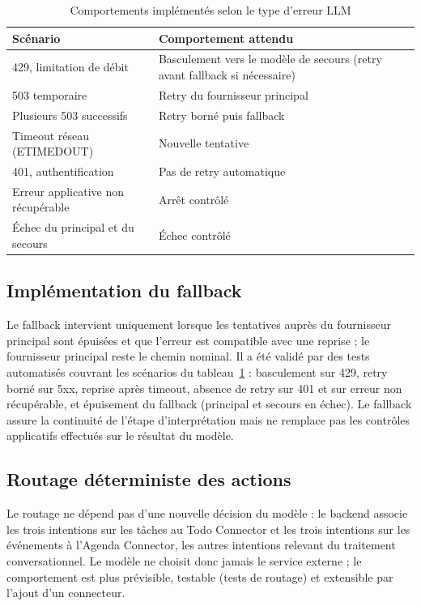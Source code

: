 \documentclass[11pt,a4paper,openany,oneside]{report}
\begin{document}
\begin{table}[htbp]
\centering\small
\caption{Comportements implémentés selon le type d'erreur LLM}\label{tab:erreurs-llm}
\begin{tabularx}{\textwidth}{@{}p{5.6cm}X@{}}
\toprule
\textbf{Scénario} & \textbf{Comportement attendu} \\
\midrule
429, limitation de débit & Basculement vers le modèle de secours (retry avant fallback si nécessaire) \\
503 temporaire & Retry du fournisseur principal \\
Plusieurs 503 successifs & Retry borné puis fallback \\
Timeout réseau (ETIMEDOUT) & Nouvelle tentative \\
401, authentification & Pas de retry automatique \\
Erreur applicative non récupérable & Arrêt contrôlé \\
Échec du principal et du secours & Échec contrôlé \\
\bottomrule
\end{tabularx}
\end{table}

\subsection{Implémentation du fallback}
Le fallback intervient uniquement lorsque les tentatives auprès du fournisseur principal sont épuisées et que l'erreur est compatible avec une reprise ; le fournisseur principal reste le chemin nominal. Il a été validé par des tests automatisés couvrant les scénarios du tableau~\ref{tab:erreurs-llm} : basculement sur 429, retry borné sur 5xx, reprise après timeout, absence de retry sur 401 et sur erreur non récupérable, et épuisement du fallback (principal et secours en échec). Le fallback assure la continuité de l'étape d'interprétation mais ne remplace pas les contrôles applicatifs effectués sur le résultat du modèle.

\subsection{Routage déterministe des actions}\label{sec:routage}
Le routage ne dépend pas d'une nouvelle décision du modèle : le backend associe les trois intentions sur les tâches au Todo Connector et les trois intentions sur les événements à l'Agenda Connector, les autres intentions relevant du traitement conversationnel. Le modèle ne choisit donc jamais le service externe ; le comportement est plus prévisible, testable (tests de routage) et extensible par l'ajout d'un connecteur.
\end{document}
